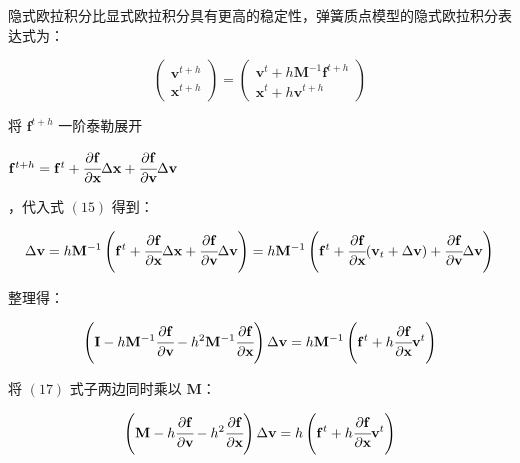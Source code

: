 \documentclass[UTF8]{ctexart}
\begin{document}
隐式欧拉积分比显式欧拉积分具有更高的稳定性，弹簧质点模型的隐式欧拉积分表达式为：

\begin{large}
\begin{equation}
\begin{pmatrix}
\mathbf{v}^{t+h} \\
\mathbf{x}^{t+h}
\end{pmatrix}
=
\begin{pmatrix}
\mathbf{v}^{t} + h \mathbf{M}^{-1} \mathbf{f}^{t+h} \\
\mathbf{x}^{t} + h \mathbf{v} ^ {t+h}
\end{pmatrix}
\end{equation}
\end{large}

将 $ \mathbf{f}^{t+h}$ 一阶泰勒展开 \begin{large} $ \mathbf{f}^{t+h} =  \mathbf{f}^{t} + \cfrac{\partial \mathbf{f}}{\partial \mathbf{x}} \Delta \mathbf{x} + \cfrac{\partial \mathbf{f}}{\partial \mathbf{v}} \Delta \mathbf{v}$\end{large}，代入式 $(15)$ 得到：

\begin{large}
\begin{equation}
\Delta \mathbf{v} = h \mathbf{M}^{-1} \left ( \mathbf{f}^{t} + \cfrac{\partial \mathbf{f}}{\partial \mathbf{x}} \Delta \mathbf{x} + \cfrac{\partial \mathbf{f}}{\partial \mathbf{v}} \Delta \mathbf{v}  \right ) = 
h \mathbf{M}^{-1} \left ( \mathbf{f}^{t} + \cfrac{\partial \mathbf{f}}{\partial \mathbf{x}} (\mathbf{v}_t + \Delta \mathbf{v}) + \cfrac{\partial \mathbf{f}}{\partial \mathbf{v}} \Delta \mathbf{v}  \right )
\end{equation}
\end{large}

整理得：

\begin{large}
\begin{equation}
\left ( \mathbf{I} - h \mathbf{M}^{-1} \cfrac{\partial \mathbf{f}}{\partial \mathbf{v}} - h^2 \mathbf{M}^{-1} \cfrac{\partial \mathbf{f}}{\partial \mathbf{x}} \right ) \Delta \mathbf{v} =
h  \mathbf{M}^{-1} \left ( \mathbf{f}^{t} + h \cfrac{\partial \mathbf{f}}{\partial \mathbf{x}} \mathbf{v}^t \right )
\end{equation}
\end{large}

将 $(17)$ 式子两边同时乘以 $\mathbf{M}$：

\begin{large}
\begin{equation}
\left ( \mathbf{M} - h \cfrac{\partial \mathbf{f}}{\partial \mathbf{v}} - h^2 \cfrac{\partial \mathbf{f}}{\partial \mathbf{x}} \right ) \Delta \mathbf{v} =
h \left ( \mathbf{f}^{t} + h \cfrac{\partial \mathbf{f}}{\partial \mathbf{x}} \mathbf{v}^t \right )
\end{equation}
\end{large}
\end{document}
